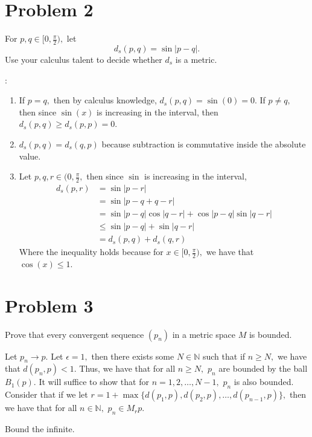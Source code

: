 \documentclass[11pt]{article}
\newcommand{\bbN}{\mathbb{N}}
\begin{document}
\section*{Problem 2}
\begin{problem}
    For $p,q\in [0,\frac{\pi}{2}),$ let 
    \[d_s(p,q) = \sin|p-q|.\]
    Use your calculus talent to decide whether $d_s$ is a metric.
\end{problem}
\begin{solution}:\\
    \begin{enumerate}
        \item If $p=q,$ then by calculus knowledge, $d_s(p,q) = \sin(0) = 0.$ If $p\neq q,$ then since $\sin(x)$ is increasing in the interval, then $d_s(p,q)\geq d_s(p,p) = 0.$
        \item $d_s(p,q) = d_s(q,p)$ because subtraction is commutative inside the absolute value.
        \item Let $p,q,r \in (0, \frac{\pi}{2},$ then since $\sin$ is increasing in the interval, 
        \begin{align*}
            d_s(p,r) &= \sin|p-r|\\
            &= \sin|p-q + q-r|\\
            &= \sin|p-q|\cos|q-r| + \cos|p-q|\sin|q-r|\\
            &\leq \sin|p-q| + \sin|q-r|\\
            &= d_s(p,q) + d_s(q,r)
        \end{align*}
        Where the inequality holds because for $x\in [0,\frac{\pi}{2}),$ we have that $\cos(x)\leq 1.$
    \end{enumerate}
\end{solution}

\newpage
\section*{Problem 3}
\begin{problem}
    Prove that every convergent sequence $(p_n)$ in a metric space $M$ is bounded.
\end{problem}
\begin{solution}
    Let $p_n \to p.$ Let $\epsilon = 1,$ then there exists some $N\in \bbN$ such that if $n\geq N,$ we have that $d(p_n, p)<1.$ Thus, we have that for all $n\geq N,$ $p_n$ are bounded by the ball $B_1(p)$. It will suffice to show that for $n  =1, 2,\dots, N-1,$ $p_n$ is also bounded. Consider that if we let $r = 1 + \max\{d(p_1, p), d(p_2, p),\dots, d(p_{n-1}, p)\},$ then we have that for all $n\in \bbN,$ $p_n \in M_r p.$
\end{solution}
\begin{reflection}
    Bound the infinite.
\end{reflection}
\end{document}
